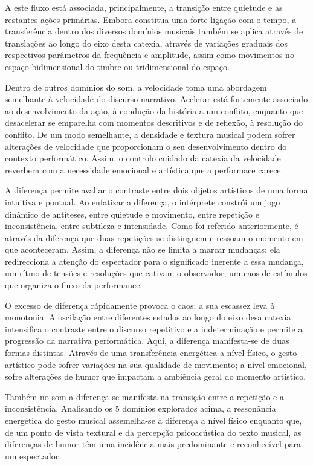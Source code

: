 \documentclass[../main.tex]{subfiles}
\begin{document}
A este fluxo está associada, principalmente, a transição entre quietude e as restantes ações primárias. Embora constitua uma forte ligação com o tempo, a transferência dentro dos diversos domínios musicais também se aplica através de translações ao longo do eixo desta catexia, através de variações graduais dos respectivos parâmetros da frequência e amplitude, assim como movimentos no espaço bidimensional do timbre ou tridimensional do espaço.

Dentro de outros domínios do som, a velocidade toma uma abordagem semelhante à velocidade do discurso narrativo. Acelerar está fortemente associado ao desenvolvimento da ação, à condução da história a um conflito, enquanto que desacelerar se emparelha com momentos descritivos e de reflexão, à resolução do conflito. De um modo semelhante, a densidade e textura musical podem sofrer alterações de velocidade que proporcionam o seu desenvolvimento dentro do contexto performático. Assim, o controlo cuidado da catexia da velocidade reverbera com a necessidade emocional e artística que a performace carece.


A diferença permite avaliar o contraste entre dois objetos artísticos de uma forma intuitiva e pontual. Ao enfatizar a diferença, o intérprete constrói um jogo dinâmico de antíteses, entre quietude e movimento, entre repetição e inconsistência, entre subtileza e intensidade. Como foi referido anteriormente, é através da diferença que duas repetições se distinguem e ressoam o momento em que aconteceram. Assim, a diferença não se limita a marcar mudanças; ela redirecciona a atenção do espectador para o significado inerente a essa mudança, um rítmo de tensões e resoluções que cativam o observador, um caos de estímulos que organiza o fluxo da performance.

O excesso de diferença rápidamente provoca o caos; a sua escassez leva à monotonia. A oscilação entre diferentes estados ao longo do eixo desa catexia intensifica o contraste entre o discurso repetitivo e a indeterminação e permite a progressão da narrativa performática. Aqui, a diferença manifesta-se de duas formas distintas. Através de uma transferência energética a nível físico, o gesto artístico pode sofrer variações na sua qualidade de movimento; a nível emocional, sofre alterações de humor que impactam a ambiência geral do momento artístico.

Também no som a diferença se manifesta na transição entre a repetição e a inconsistência. Analisando os 5 domínios explorados acima, a ressonância energética do gesto musical assemelha-se à diferença a nível físico enquanto que, de um ponto de vista textural e da percepção psicoacústica do texto musical, as diferenças de humor têm uma incidência mais predominante e reconhecível para um espectador.
\end{document}
